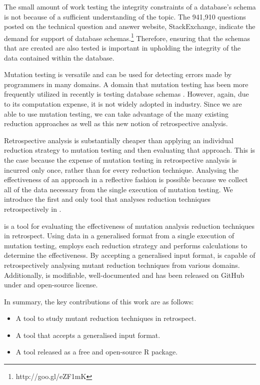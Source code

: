 The small amount of work testing the integrity constraints of a database's schema is not
because of a sufficient understanding of the topic. The 941,910 questions posted on
the technical question and answer website, StackExchange, indicate the demand for support
of database schemas.\footnote{http://goo.gl/eZF1mK} Therefore, ensuring that
the schemas that are created are also tested is important in upholding the integrity
of the data contained within the database.

Mutation testing is versatile and can be used for detecting errors made by programmers in many domains.
A domain that mutation testing has been more frequently utilized in recently is testing database
schemas \cite{mcminn2016virtual, mcminn2015effectiveness, wright2013efficient}. However,
again, due to its computation expense, it is not widely adopted in industry. Since we
are able to use mutation testing, we can take advantage of the many
existing reduction approaches \cite{jia2011analysis, wong1995reducing, offutt1993experimental, offutt2001mutation}
as well as this new notion of retrospective analysis.

Retrospective analysis is substantially cheaper than applying an
individual reduction strategy to mutation testing and then evaluating that
approach. This is the case because the expense of mutation testing in
retrospective analysis is incurred only once, rather than for
every reduction technique. Analysing the effectiveness of an approach in a reflective fashion
is possible because we collect all of the data necessary from
the single execution of mutation testing. We introduce the
first and only tool that analyses reduction techniques retrospectively
in \mr.

\mr is a tool for evaluating the effectiveness of mutation analysis reduction techniques
in retrospect. Using data in a generalised format from a single execution of mutation testing, \mr
employs each reduction strategy and performs calculations to determine the
effectiveness. By accepting a generalised input format, \mr is capable of
retrospectively analysing mutant reduction techniques from various domains.
Additionally, \mr is modifiable, well-documented and has been released on
GitHub under and open-source license.

    In summary, the key contributions of this work are as follows:
    \begin{itemize}
        \item A tool to study mutant reduction techniques in retrospect.
        \item A tool that accepts a generalised input format.
        \item A tool released as a free and open-source R package.
    \end{itemize}
